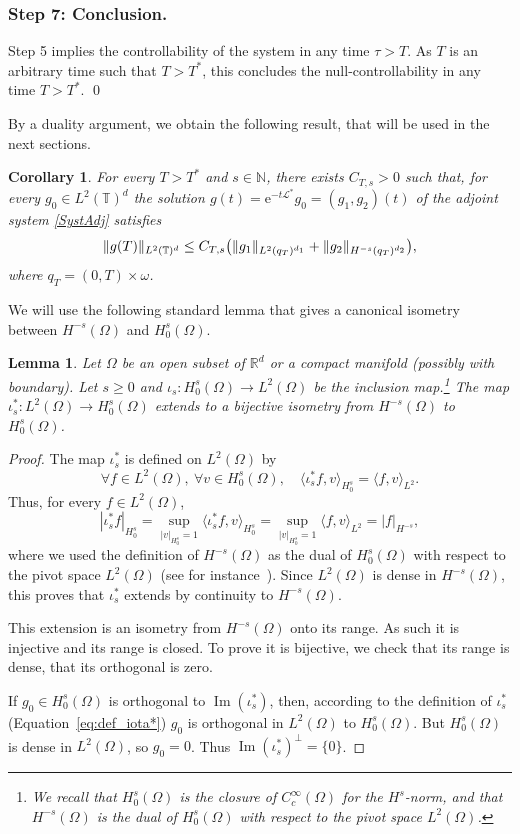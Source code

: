 \documentclass[JEP,XML,SOM,Unicode,NoEqCountersInSection]{cedram}
\let\mathcal\mathscr
\theoremstyle{plain}
\newtheorem{corollary}[theorem]{Corollary}
\newtheorem{lemma}[theorem]{Lemma}
\theoremstyle{definition}
\theoremstyle{remark}
\DeclareMathOperator{\Ima}{Im}
\newcommand{\set}{\mathbb}
\newcommand{\R}{} %
\renewcommand{\R}{\set{R}}
\newcommand{\T}{\set{T}}
\newcommand{\eu}{\mathrm e}
\let\originalleft\left
\let\originalright\right
\renewcommand{\left}{\mathopen{}\mathclose\bgroup\originalleft}
\renewcommand{\right}{\aftergroup\egroup\originalright}
\begin{document}
\subsubsection*{Step 7: Conclusion.} Step 5 implies the controllability of the system in any time \hbox{$\tau>T$}. As $T$ is an arbitrary time such that $T>T^\ast$, this concludes the null-controllability in any time $T>T^\ast$. \hfill\qed
\medskip

By a duality argument, we obtain the following result, that will be used in the next sections.

\begin{corollary}
\label{CorHUM}
For every $T>T^*$ and $s\in\mathbb{N}$, there exists $C_{T,s}>0$ such that,
for every $g_0 \in L^2(\T)^d$ the solution $g(t)=\eu^{-t\mathcal{L}^*} g_0=(g_1,g_2)(t)$ of the adjoint system \eqref{SystAdj} satisfies
\[
\|g(T)\|_{L^2(\T)^d} \leq C_{T,s} \left(\|g_1\|_{L^2(q_T)^{d_1}} + \|g_2\|_{H^{-s}(q_T)^{d_2}} \right),
\]
where $q_T=(0,T)\times\omega$.
\end{corollary}
We will use the following standard lemma that gives a canonical isometry between $H^{-s}(\Omega)$ and $H_0^s(\Omega)$.
\begin{lemma}\label{th:lemma_dual_Hs}
Let $\Omega$ be an open subset of $\R^d$ or a compact manifold (possibly with boundary). Let $s\geq 0$ and $\iota_s\colon H^s_0(\Omega)\to L^2(\Omega)$ be the inclusion map.\footnote{We recall that $H^s_0(\Omega)$ is the closure of $C_c^\infty(\Omega)$ for the $H^s$-norm, and that $H^{-s}(\Omega)$ is the dual of $H^s_0(\Omega)$ with respect to the pivot space $L^2(\Omega)$.} The map $\iota_s^*\colon L^2(\Omega) \to H^s_0(\Omega)$ extends to a bijective isometry from $H^{-s}(\Omega)$ to $H^{s}_0(\Omega)$.
\end{lemma}
\begin{proof}
The map $\iota_s^*$ is defined on $L^2(\Omega)$ by
\begin{equation}\label{eq:def_iota*}
\forall f\in L^2(\Omega),\ \forall v\in H^s_0(\Omega),\quad \langle \iota_s^*f,v\rangle_{H^s_0} = \langle f,v\rangle_{L^2}.\end{equation}
Thus, for every $f\in L^2(\Omega)$,
\[
|\iota_s^*f|_{H^s_0} = \sup_{|v|_{H^s_0} = 1} \langle \iota_s^*f,v\rangle_{H^s_0} = \sup_{|v|_{H^s_0}=1} \langle f,v\rangle_{L^2} = |f|_{H^{-s}},
\]
where we used the definition of $H^{-s}(\Omega)$ as the dual of $H^s_0(\Omega)$ with respect to
the pivot space $L^2(\Omega)$ (see for instance~\cite[\S2.9]{tucsnak_2009}). Since
$L^2(\Omega)$ is dense in $H^{-s}(\Omega)$, this proves that $\iota_s^*$ extends by continuity
to $H^{-s}(\Omega)$.

This extension is an isometry from $H^{-s}(\Omega)$ onto its range. As such it is injective and its range is closed. To prove it is bijective, we check that its range is dense, \ie that its orthogonal is zero.

If $g_0\in H^s_0(\Omega)$ is orthogonal to $\Ima(\iota_s^*)$, then, according to the definition
of $\iota_s^*$ (Equation~\eqref{eq:def_iota*}) $g_0$ is orthogonal in $L^2(\Omega)$ to
$H^s_0(\Omega)$. But $H^s_0(\Omega)$ is dense in $L^2(\Omega)$, so $g_0 = 0$. Thus
$\Ima(\iota_s^*)^\perp = \{0\}$.
\end{proof}
\end{document}
